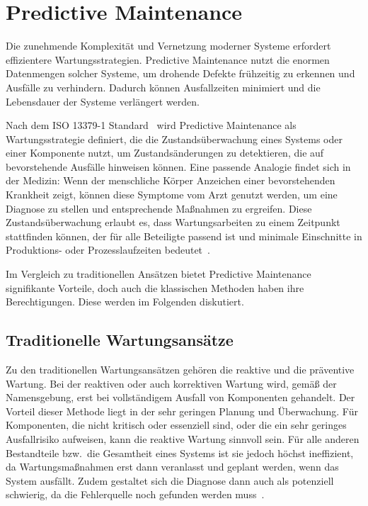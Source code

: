 \chapter{Predictive Maintenance}\label{ch:pdm_theorie}
Die zunehmende Komplexität und Vernetzung moderner Systeme erfordert effizientere Wartungsstrategien. Predictive Maintenance nutzt die
enormen Datenmengen solcher Systeme, um drohende Defekte frühzeitig zu erkennen und Ausfälle zu verhindern. Dadurch können
Ausfallzeiten minimiert und die Lebensdauer der Systeme verlängert werden.

Nach dem ISO 13379{-}1 Standard~\cite{ISO2012} wird Predictive Maintenance als Wartungsstrategie definiert, die die Zustandsüberwachung
eines Systems oder einer Komponente nutzt, um Zustandsänderungen zu detektieren, die auf bevorstehende Ausfälle hinweisen können.
Eine passende Analogie findet sich in der Medizin: Wenn der menschliche Körper Anzeichen einer bevorstehenden Krankheit zeigt, können
diese Symptome vom Arzt genutzt werden, um eine Diagnose zu stellen und entsprechende Maßnahmen zu ergreifen.
Diese Zustandsüberwachung erlaubt es, dass Wartungsarbeiten zu einem Zeitpunkt stattfinden können, der für alle Beteiligte passend ist
und minimale Einschnitte in Produktions- oder Prozesslaufzeiten bedeutet~\cite{Scheffer2004}.

Im Vergleich zu traditionellen Ansätzen bietet Predictive Maintenance signifikante Vorteile,
doch auch die klassischen Methoden haben ihre Berechtigungen. Diese werden im Folgenden diskutiert.

\section{Traditionelle Wartungsansätze}\label{sec:trad_maintenance}
Zu den traditionellen Wartungsansätzen gehören die reaktive und die präventive Wartung. Bei der reaktiven oder auch korrektiven
Wartung wird, gemäß der Namensgebung, erst bei vollständigem Ausfall von Komponenten gehandelt.
Der Vorteil dieser Methode liegt in der sehr geringen Planung und Überwachung. Für Komponenten,
die nicht kritisch oder essenziell sind, oder die ein sehr geringes Ausfallrisiko aufweisen, kann die reaktive Wartung sinnvoll sein.
Für alle anderen Bestandteile bzw.~die Gesamtheit eines Systems ist sie jedoch höchst ineffizient, da Wartungsmaßnahmen erst dann
veranlasst und geplant werden, wenn das System ausfällt. Zudem gestaltet sich die Diagnose dann auch als potenziell schwierig, da die
Fehlerquelle noch gefunden werden muss~\cite{Abdelli2022}.

